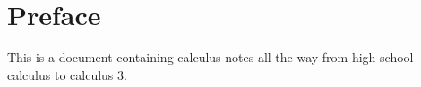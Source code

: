 \documentclass[working]{tuftebook}
\begin{document}
\chapter*{Preface}
\vspace{-2em}
This is a document containing calculus notes all the way from high school calculus to calculus 3. 
\end{document}
